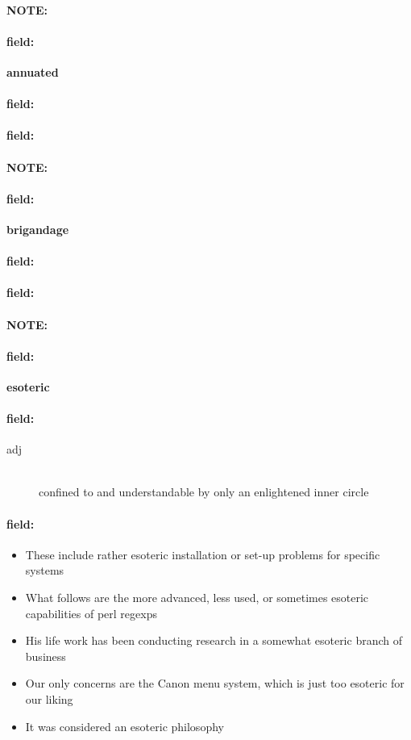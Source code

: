 \documentclass[12pt]{article}
\newenvironment{note}{\paragraph{NOTE:}}{}
\newenvironment{field}{\paragraph{field:}}{}
\begin{document}
\begin{note}
\begin{field}
\textbf{\large annuated}
\end{field}


\begin{field}
\end{field}

\begin{field}
\end{field}
\end{note}
\begin{note}
\begin{field}
\textbf{\large brigandage}
\end{field}


\begin{field}
\end{field}

\begin{field}
\end{field}
\end{note}
\begin{note}
\begin{field}
\textbf{\large esoteric}
\end{field}


\begin{field}
\begin{description}
\item[adj] \hfill \\ 
confined to and understandable by only an enlightened inner circle

\end{description}
\end{field}

\begin{field}
\begin{itemize}
\item These include rather esoteric installation or set-up problems for specific systems
\item What follows are the more advanced, less used, or sometimes esoteric capabilities of perl regexps
\item His life work has been conducting research in a somewhat esoteric branch of business
\item Our only concerns are the Canon menu system, which is just too esoteric for our liking
\item It was considered an esoteric philosophy
\end{itemize}
\end{field}
\end{note}
\end{document}
